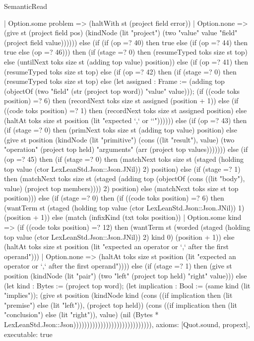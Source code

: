 \begin{lexlean}{SemanticRead}
\begin{semanticmodule}
{{    | Option.some problem => (haltWith st (project field error))
    | Option.none => (give st (project field pos) (kindNode (lit "project") (two "value" value "field" (project field value)))))) else (if (if (op =? 40) then true else (if (op =? 44) then true else (op =? 46))) then (if (stage =? 0) then (resumeTyped toks size st top) else (untilNext toks size st (adding top value) position)) else (if (op =? 41) then (resumeTyped toks size st top) else (if (op =? 42) then (if (stage =? 0) then (resumeTyped toks size st top) else (let assigned : Frame := (adding top (objectOf (two "field" (str (project top word)) "value" value))); (if ((code toks position) =? 6) then (recordNext toks size st assigned (position + 1)) else (if ((code toks position) =? 1) then (recordNext toks size st assigned position) else (haltAt toks size st position (lit "expected `,` or `}`")))))) else (if (op =? 43) then (if (stage =? 0) then (primNext toks size st (adding top value) position) else (give st position (kindNode (lit "primitive") (cons ((lit "result"), value) (two "operation" (project top held) "arguments" (arr (project top values))))))) else (if (op =? 45) then (if (stage =? 0) then (matchNext toks size st (staged (holding top value (ctor LexLeanStd.Json::Json.JNil)) 2) position) else (if (stage =? 1) then (matchNext toks size st (staged (adding top (objectOf (cons ((lit "body"), value) (project top members)))) 2) position) else (matchNext toks size st top position))) else (if (stage =? 0) then (if ((code toks position) =? 6) then (wantTerm st (staged (holding top value (ctor LexLeanStd.Json::Json.JNil)) 1) (position + 1)) else (match (infixKind (txt toks position))
    | Option.some kind => (if ((code toks position) =? 12) then (wantTerm st (worded (staged (holding top value (ctor LexLeanStd.Json::Json.JNil)) 2) kind 0) (position + 1)) else (haltAt toks size st position (lit "expected an operator or `,` after the first operand")))
    | Option.none => (haltAt toks size st position (lit "expected an operator or `,` after the first operand")))) else (if (stage =? 1) then (give st position (kindNode (lit "pair") (two "left" (project top held) "right" value))) else (let kind : Bytes := (project top word); (let implication : Bool := (same kind (lit "implies")); (give st position (kindNode kind (cons ((if implication then (lit "premise") else (lit "left")), (project top held)) (cons ((if implication then (lit "conclusion") else (lit "right")), value) (nil (Bytes * LexLeanStd.Json::Json))))))))))))))))))))))))))))),
  axioms: [Quot.sound, propext],
  executable: true
}


\end{semanticmodule}
\end{lexlean}
